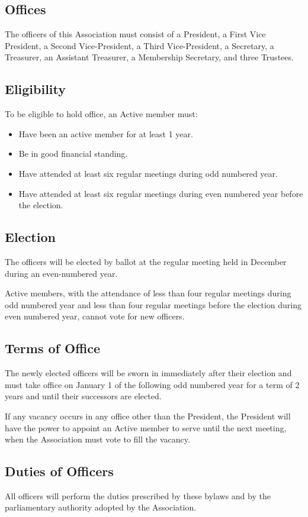 \documentclass[12pt,letterpaper]{article}
\begin{document}
\subsection{Offices}
The officers of this Association must consist of a President, a First Vice President, a Second Vice-President, a Third Vice-President, a Secretary, a Treasurer, an Assistant Treasurer, a Membership Secretary, and three Trustees. 

\subsection{Eligibility}
To be eligible to hold office, an Active member must:
\begin{itemize}
\item Have been an active member for at least 1 year.
\item Be in good financial standing.
\item Have attended at least six regular meetings during odd numbered year.
\item Have attended at least six regular meetings during even numbered year before the election.
\end{itemize}

\subsection{Election}
The officers will be elected by ballot at the regular meeting held in December during an even-numbered year. 

Active members, with the attendance of less than four regular meetings during odd numbered year and less than four regular meetings before the election during even numbered year, cannot vote for new officers. 

\subsection{Terms of Office}
The newly elected officers will be sworn in immediately after their election and must take office on January 1 of the following odd numbered year for a term of 2 years and until their successors are elected. 

If any vacancy occurs in any office other than the President, the President will have the power to appoint an Active member to serve until the next meeting, when the Association must vote to fill the vacancy.

\subsection{Duties of Officers}
All officers will perform the duties prescribed by these bylaws and by the parliamentary authority adopted by the Association.
\end{document}
